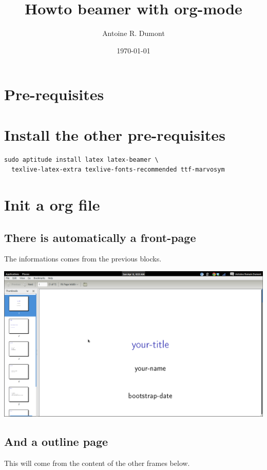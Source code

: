 \documentclass[11pt]{article}
\title{Howto beamer with org-mode}
\author{Antoine R. Dumont}
\date{\today}
\begin{document}
\maketitle

\setcounter{tocdepth}{3}
\tableofcontents
\vspace*{1cm}

\section{Pre-requisites}
\label{sec-1}
\section{Install the other pre-requisites}
\label{sec-2}


\begin{verbatim}
sudo aptitude install latex latex-beamer \
  texlive-latex-extra texlive-fonts-recommended ttf-marvosym
\end{verbatim}
\section{Init a org file}
\label{sec-3}
\subsection{There is automatically a front-page}
\label{sec-3-3}

The informations comes from the previous blocks.

\includegraphics[width=.9\linewidth]{./org-beamer-examples/front-page.png}
\subsection{And a outline page}
\label{sec-3-4}


This will come from the content of the other frames below.
\end{document}
